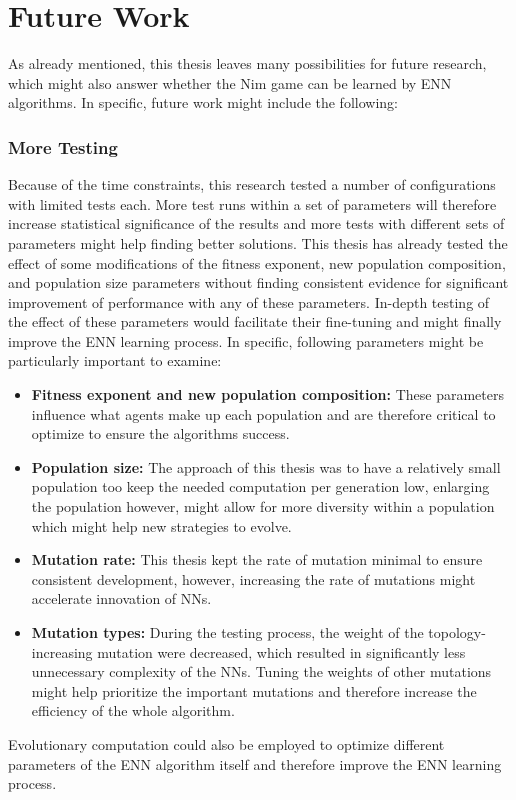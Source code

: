 \section{Future Work}\label{sec:future-work}
As already mentioned, this thesis leaves many possibilities for future research, which might also answer whether the Nim game can be learned by ENN algorithms.
In specific, future work might include the following:

\subsubsection{More Testing}
Because of the time constraints, this research tested a number of configurations with limited tests each.
More test runs within a set of parameters will therefore increase statistical significance of the results and more tests with different sets of parameters might help finding better solutions.
This thesis has already tested the effect of some modifications of the fitness exponent, new population composition, and population size parameters without finding consistent evidence for significant improvement of performance with any of these parameters.
In-depth testing of the effect of these parameters would facilitate their fine-tuning and might finally improve the ENN learning process.
In specific, following parameters might be particularly important to examine:
\begin{itemize}
    \item \textbf{Fitness exponent and new population composition:} These parameters influence what agents make up each population and are therefore critical to optimize to ensure the algorithms success.
    \item \textbf{Population size:} The approach of this thesis was to have a relatively small population too keep the needed computation per generation low, enlarging the population however, might allow for more diversity within a population which might help new strategies to evolve.
    \item \textbf{Mutation rate:} This thesis kept the rate of mutation minimal to ensure consistent development, however, increasing the rate of mutations might accelerate innovation of NNs.
    \item \textbf{Mutation types:} During the testing process, the weight of the topology-increasing mutation were decreased, which resulted in significantly less unnecessary complexity of the NNs.
    Tuning the weights of other mutations might help prioritize the important mutations and therefore increase the efficiency of the whole algorithm.
\end{itemize}
Evolutionary computation could also be employed to optimize different parameters of the ENN algorithm itself and therefore improve the ENN learning process.

